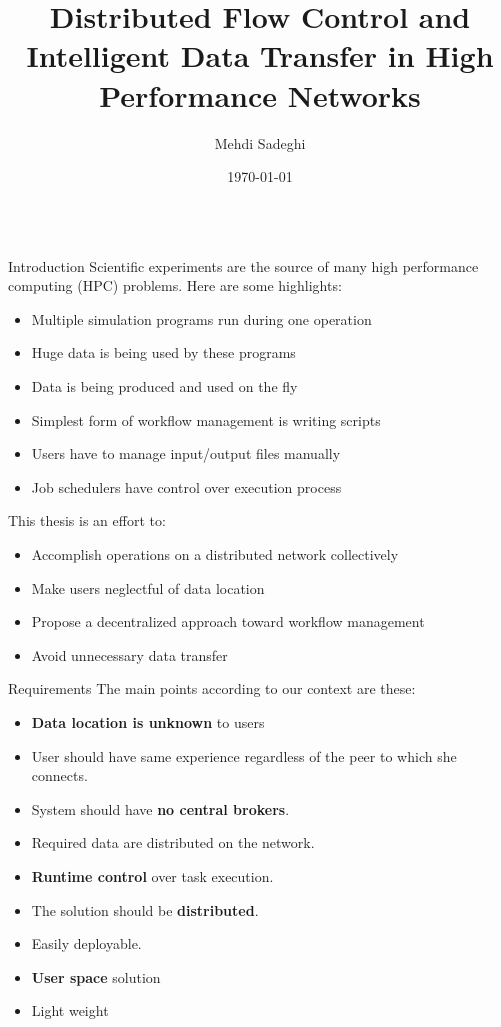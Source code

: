 \documentclass[final,hyperref={pdfpagelabels=true}]{beamer}
\title[Communication and Media Engineering]{Distributed Flow Control and Intelligent Data Transfer in High Performance Networks}
\author[msadeghi@stud.hs-offenburg.de]{Mehdi Sadeghi}
\institute[]{%
  Hochschule für Technik, Wirtschaft und Medien Offenburg\\[0.25\baselineskip]
  Fakultät Medien und Informationswesen\\[0.25\baselineskip]
  Professorin: Dr. Katharina Mehner-Heindl\\[0.25\baselineskip]
  Betreuer: Dr. Adham Hashibon
}
\date[\today]{\today}
\begin{document}
\begin{frame}
\fontsize{30pt}{31}\selectfont
  \begin{columns}[t]
    \begin{column}{.45\textwidth}
      \begin{block}{Introduction}
Scientific experiments are the source of many high performance computing (HPC) problems. Here are
some highlights:

\begin{itemize}
\item Multiple simulation programs run during one operation
\item Huge data is being used by these programs
\item Data is being produced and used on the fly
\item Simplest form of workflow management is writing scripts
\item Users have to manage input/output files manually
\item Job schedulers have control over execution process
\end{itemize}

      This thesis is an effort to:%
      \begin{itemize}
      \item Accomplish operations on a distributed network collectively
      \item Make users neglectful of data location
      \item Propose a decentralized approach toward workflow management
      \item Avoid unnecessary data transfer
      \end{itemize}

      \end{block}
      
      \begin{block}{Requirements}
      The main points according to our context are these:
        \begin{itemize}
        \item \textbf{Data location is unknown} to users
        \item User should have same experience regardless of the peer to which she connects.
        \item System should have \textbf{no central brokers}.
        \item Required data are distributed on the network.
        \item \textbf{Runtime control} over task execution.
        \item The solution should be \textbf{distributed}.
        \item Easily deployable.
        \item \textbf{User space} solution
        \item Light weight
        \end{itemize}
      \end{block}


\end{column}
\end{columns}
\end{frame}
\end{document}
